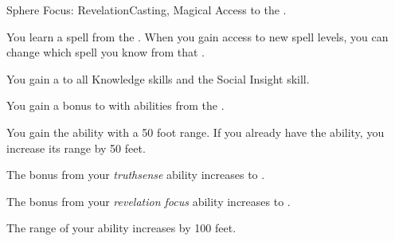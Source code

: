     \begin{feat}{Sphere Focus: Revelation}{Casting, Magical}
        \featpre Access to the  .

         You learn a spell from the  .
        When you gain access to new spell levels, you can change which spell you know from that .

         You gain a   to all Knowledge skills and the Social Insight skill.

         You gain a  bonus to  with abilities from the  .

         You gain the  ability with a 50 foot range.
        If you already have the  ability, you increase its range by 50 feet.

         The bonus from your \textit{truthsense} ability increases to .

         The bonus from your \textit{revelation focus} ability increases to .

         The range of your  ability increases by 100 feet.
    \end{feat}

